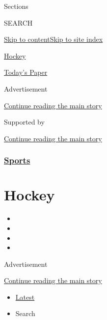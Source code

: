 Sections

SEARCH

\protect\hyperlink{site-content}{Skip to
content}\protect\hyperlink{site-index}{Skip to site index}

\href{https://www.nytimes.com/section/sports/hockey}{Hockey}

\href{https://myaccount.nytimes.com/auth/login?response_type=cookie\&client_id=vi}{}

\href{https://www.nytimes.com/section/todayspaper}{Today's Paper}

Advertisement

\protect\hyperlink{after-top}{Continue reading the main story}

Supported by

\protect\hyperlink{after-sponsor}{Continue reading the main story}

\hypertarget{sports}{%
\subsubsection{\texorpdfstring{\href{/section/sports}{Sports}}{Sports}}\label{sports}}

\hypertarget{hockey}{%
\section{Hockey}\label{hockey}}

\begin{itemize}
\item
\item
\item
\item
\end{itemize}

Advertisement

\protect\hyperlink{after-subheader}{Continue reading the main story}

\begin{itemize}
\tightlist
\item
  \protect\hyperlink{stream-panel}{Latest}
\item
  Search
\end{itemize}

